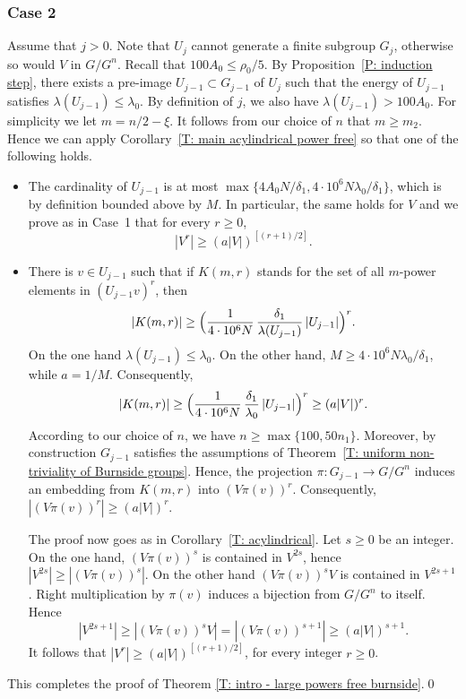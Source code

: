 \documentclass[11pt]{article}
\theoremstyle{plain}
\theoremstyle{definition}
\begin{document}
\subsubsection*{Case 2}
Assume that $j > 0$.
Note that $U_j$ cannot generate a finite subgroup $G_j$, otherwise so would $V$ in $G/G^n$.
Recall that $100 A_0 \leq \rho_0/5$.
By Proposition~\ref{P: induction step}, there exists a pre-image $U_{j-1}\subset G_{j-1}$ of $U_j$ such that the energy of $U_{j-1}$ satisfies $\lambda(U_{j-1}) \leqslant \lambda_0$.
By definition of $j$, we also have $\lambda(U_{j-1})> 100A_0$.
For simplicity we let $m = n/2 - \xi$.
It follows from our choice of $n$ that $m \geq m_2$.
Hence we can apply Corollary~\ref{T: main acylindrical power free} so that one of the following holds.
\begin{itemize}
\item The cardinality of $U_{j-1}$ is at most $\max\{4A_0N/\delta_1,4\cdot 10^6 N \lambda_0/\delta_1\}$, which is by definition bounded above by $M$.
In particular, the same holds for $V$ and we prove as in Case~1 that for every $r \geq 0$,
\begin{equation*}
|V^r| \geq \left(a |V|\right)^{[(r+1)/2]}.
\end{equation*}
\item There is $v \in U_{j-1}$ such that if $K(m,r)$ stands for the set of all $m$-power elements in $(U_{j-1}v)^r$, then
\begin{equation*}
|K(m,r)|
\geq \Bigl( \frac{1}{4\cdot 10^6 N}\,\frac{\delta_1}{\lambda(U_{j-1})}\, |U_{j-1}|\Bigr)^r.
\end{equation*}
On the one hand $\lambda(U_{j-1}) \leqslant \lambda_0$.
On the other hand, $M \geq 4\cdot 10^6 N \lambda_0/\delta_1$, while $a = 1/M$.
Consequently,
\begin{equation*}
|K(m,r)|
\geq \Bigl( \frac{1}{4\cdot 10^6 N}\,\frac{\delta_1}{\lambda_0}\, |U_{j-1}|\Bigr)^r
\geq(a|V|)^r.
\end{equation*}
According to our choice of $n$, we have $n \geq \max\{100, 50n_1\}$.
Moreover, by construction $G_{j-1}$ satisfies the assumptions of Theorem~\ref{T: uniform non-triviality of Burnside groups}.
Hence, the projection $\pi \colon G_{j-1} \to G/G^n$ induces an embedding from $K(m,r)$ into $(V \pi(v))^r$.
Consequently, $|(V \pi(v))^r| \geq \left(a |V|\right)^{r}.$

The proof now goes as in Corollary~\ref{T: acylindrical}.
Let $s \geq 0$ be an integer.
On the one hand, $(V\pi(v))^s$ is contained in $V^{2s}$, hence $|V^{2s}| \geq |(V\pi(v))^s|$.
On the other hand $(V\pi(v))^sV$ is contained in $V^{2s+1}$.
Right multiplication by $\pi(v)$ induces a bijection from $G/G^n$ to itself.
Hence
\begin{equation*}
|V^{2s+1}| \geq |(V\pi(v))^sV| = |(V\pi(v))^{s+1}| \geq \left(a |V|\right)^{s+1}.
\end{equation*}
It follows that $|V^r| \geq \left(a |V|\right)^{[(r+1)/2]}$, for every integer $r \geq 0$.
\end{itemize}
This completes the proof of Theorem \ref{T: intro - large powers free burnside}.\qed
\end{document}
